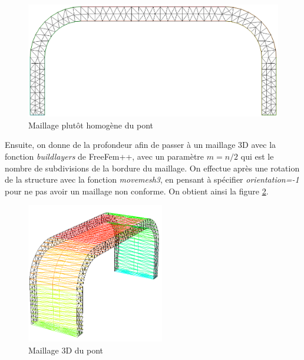     \begin{figure}     
        \begin{center}
        
            \includegraphics[width=12cm]{imgs/all_maillage_pondere.PNG}
            \caption{Maillage plutôt homogène du pont}
            \label{fig:maillage_pondere}
        
        \end{center}
    \end{figure}

    Ensuite, on donne de la profondeur afin de passer à un maillage 3D avec la fonction \emph{buildlayers} de FreeFem++, 
    avec un paramètre $m=n/2$ qui est le nombre de subdivisions de la bordure du maillage. On effectue après une rotation de la structure 
    avec la fonction \emph{movemesh3}, en pensant à spécifier \emph{orientation=-1} pour ne pas avoir un maillage non conforme.
    On obtient ainsi la figure \ref{fig:maillage_3d}.

    
    \begin{figure}        
        \begin{center}
        
            \includegraphics[width=6cm]{imgs/all_maillage_3d.PNG}
            \caption{Maillage 3D du pont}
            \label{fig:maillage_3d}
        
        \end{center}
    \end{figure}

